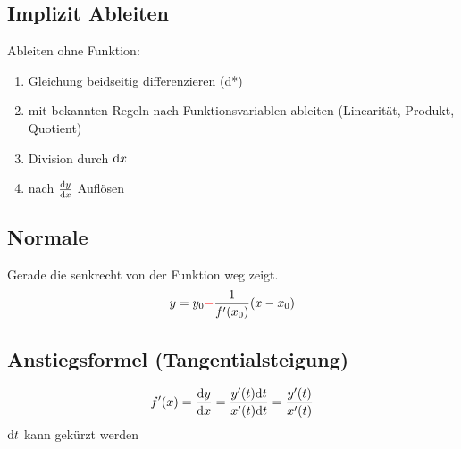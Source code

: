 \subsection{Implizit Ableiten}
Ableiten ohne Funktion:
\begin{enumerate}
\item Gleichung beidseitig differenzieren (d*)
\item mit bekannten Regeln nach Funktionsvariablen ableiten (Linearität, Produkt, Quotient)
\item Division durch $\mathrm{d}x$
\item nach $\frac{\mathrm{d}y}{\mathrm{d}x}$ Auflösen
\end{enumerate}

\subsection{Normale}
Gerade die senkrecht von der Funktion weg zeigt.
\[
y = y_0{\color{red}-}\frac{1}{f'(x_0)}(x-x_0)
\]

\subsection{Anstiegsformel (Tangentialsteigung)}
\[
f'(x)=\frac{\mathrm{d}y}{\mathrm{d}x}=\frac{y'(t)\mathrm{d}t}{x'(t)\mathrm{d}t}=\frac{y'(t)}{x'(t)}
\]
$\mathrm{d}t$ kann gekürzt werden


